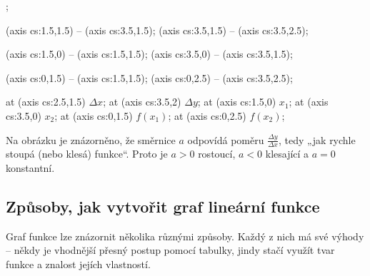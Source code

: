\documentclass[12pt,a4paper]{article}
\begin{document}
\begin{center}
\begin{axisgraph}[
    xmin=-2, xmax=5,
    ymin=-1, ymax=4,
    enlarge x limits=0.15,  %
    enlarge y limits=0.1,   %
    clip=false,
    axis lines=middle,
    grid=none,
    xtick={1},
    ytick={1},
    title={Význam směrnice $a$}
]
    ;


     (axis cs:1.5,1.5) -- (axis cs:3.5,1.5);
     (axis cs:3.5,1.5) -- (axis cs:3.5,2.5);

     (axis cs:1.5,0) -- (axis cs:1.5,1.5);
     (axis cs:3.5,0) -- (axis cs:3.5,1.5);

     (axis cs:0,1.5) -- (axis cs:1.5,1.5);
     (axis cs:0,2.5) -- (axis cs:3.5,2.5);

     at (axis cs:2.5,1.5) {$\Delta x$};
     at (axis cs:3.5,2) {$\Delta y$};
     at (axis cs:1.5,0) {$x_1$};
     at (axis cs:3.5,0) {$x_2$};
     at (axis cs:0,1.5) {$f(x_1)$};
     at (axis cs:0,2.5) {$f(x_2)$};
\end{axisgraph}
\end{center}

\noindent
Na obrázku je znázorněno, že směrnice \(a\) odpovídá poměru \(\frac{\Delta y}{\Delta x}\),  
tedy „jak rychle stoupá (nebo klesá) funkce“.  
Proto je \(a>0\) rostoucí, \(a<0\) klesající a \(a=0\) konstantní.




\subsection{Způsoby, jak vytvořit graf lineární funkce}

Graf funkce lze znázornit několika různými způsoby.  
Každý z nich má své výhody – někdy je vhodnější přesný postup pomocí tabulky,  
jindy stačí využít tvar funkce a znalost jejích vlastností.
\end{document}
